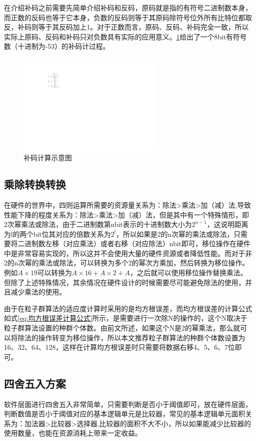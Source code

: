 在介绍补码之前需要先简单介绍补码和反码，原码就是指的有符号二进制数本身，而正数的反码也等于它本身，负数的反码则等于其原码除符号位外所有比特位都取反，补码则等于其反码加上1。对于正数而言，原码、反码、补码完全一致，所以实际上原码、反码和补码只对负数具有实际的应用意义。\ref{fig:补码计算示意图}给出了一个8bit有符号数（十进制为-53）的补码计过程。
\begin{figure}[htb]
  \centering
  \includegraphics[width=7cm]{fig/4-fig/补码计算示意图.pdf}
  \caption{补码计算示意图}
  \label{fig:补码计算示意图}
\end{figure}

\subsection{乘除转换转换}
在硬件的世界中，四则运算所需要的资源量关系为：除法>乘法>加（减）法,导致性能下降的程度关系为：除法>乘法>加（减）法，但是其中有一个特殊情形，即2次幂乘法或除法，由于二进制数第nbit表示的十进制数大小为$2^{n-1}$，这说明距离为l的两个bit位其对应的倍数关系为$2^{l}$，所以如果是2的n次幂的乘法或除法，只需要将二进制数左移（对应乘法）或者右移（对应除法）nbit即可，移位操作在硬件中是非常容易实现的，所以这并不会使用大量的硬件资源或者降低性能。而对于非2的n次幂的乘法或除法，可以转换为多个2的幂次方乘加，然后转换为移位操作。例如$A\times 19$可以转换为$A\times 16 +A\times 2+A$，之后就可以使用移位操作替换乘法。但除了上述特殊情况，其余情况在硬件设计的时候需要尽可能避免除法的使用，并且减少乘法的使用。

由于在粒子群算法的适应度计算时采用的是均方根误差，而均方根误差的计算公式如式\eqref{eq:均方根误差计算公式}所示，是需要进行一次除N的操作的，这个N取决于粒子群算法设置的种群个体数。由前文所述，如果这个N是2的幂乘法，那么就可以将除法的操作转变为移位操作，所以本文推荐粒子群算法的种群个体数设置为16、32、64、128，这样在计算均方根误差时只需要将数据右移4、5、6、7位即可。

\subsection{四舍五入方案}
软件层面进行四舍五入非常简单，只需要判断是否小于阈值即可，放在硬件层面，判断数值是否小于阈值对应的基本逻辑单元是比较器，常见的基本逻辑单元面积关系为：加法器>比较器>选择器,比较器的面积不大不小，所以如果能减少比较器的使用数量，也能在资源消耗上带来一定收益。

